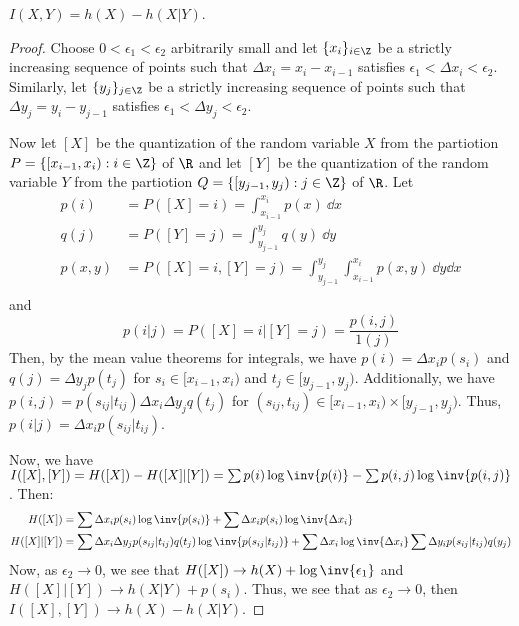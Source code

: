 \begin{theorem}\label{2.3.2}
    $I(X,Y)=h(X)-h(X|Y)$.
\end{theorem}
\begin{proof}
    Choose $0<\epsilon_1<\epsilon_2$ arbitrarily small and let $\{x_i\}_{i \in
    \Z}$ be a strictly increasing sequence of points such that
    $\Delta{x_i}=x_i-x_{i-1}$ satisfies $\epsilon_1<\Delta{x_i}<\epsilon_2$.
    Similarly, let $\{y_j\}_{j \in \Z}$ be a strictly increasing sequence of
    points such that $\Delta{y_j}=y_i-y_{j-1}$ satisfies
    $\epsilon_1<\Delta{y_j}<\epsilon_2$.

    Now let $[X]$ be the quantization of the random variable $X$ from the
    partiotion  $P=\{[x_{i-1},x_i) : i \in \Z\}$ of $\R$ and  let $[Y]$ be the
    quantization of the random variable $Y$ from the partiotion  $Q=\{[y_{j-1},y_j)
    : j \in \Z\}$ of $\R$. Let
    \begin{align*}
        p(i) &= P([X]=i)=\int_{x_{i-1}}^{x_i}{p(x)} \ \dd{x} \\
        q(j) &= P([Y]=j)=\int_{y_{j-1}}^{y_j}{q(y)} \ \dd{y} \\
        p(x,y) &=
        P([X]=i,[Y]=j)=\int_{y_{j-1}}^{y_j}{\int_{x_{i-1}}^{x_i}{p(x,y)}} \
        \dd{y}\dd{x} \\
    \end{align*}
    and
    \begin{equation*}
        p(i|j)=P([X]=i|[Y]=j)=\frac{p(i,j)}{1(j)}
    \end{equation*}
    Then, by the mean value theorems for integrals, we have
    $p(i)=\Delta{x_i}p(s_i)$ and  $q(j)=\Delta{y_j}p(t_j)$ for $s_i \in
    [x_{i-1}, x_i)$ and $t_j \in [y_{j-1},y_j)$. Additionally, we have
    $p(i,j)=p(s_{ij}|t_{ij})\Delta{x_i}\Delta{y_j}q(t_j)$ for $(s_{ij},t_{ij})
    \in [x_{i-1}, x_i) \times [y_{j-1},y_j)$. Thus,
    $p(i|j)=\Delta{x_i}p(s_{ij}|t_{ij})$.

    Now, we have $I([X],[Y])=H([X])-H([X]|[Y])=\sum{p(i)\log{\inv{p(i)}}}-
    \sum{p(i,j)\log{\inv{p(i,j)}}}$. Then:
    \begin{align*}
        H([X]) &= \sum{\Delta{x_i}p(s_i)\log{\inv{p(s_i)}}}+
                    \sum{\Delta{x_i}p(s_i)\log{\inv{\Delta{x_i}}}} \\
        H([X]|[Y]) &= \sum{\Delta{x_i}\Delta{y_j}p(s_{ij}|t_{ij})q(t_j)
        \log{\inv{p(s_{ij}|t_{ij})}}}+\sum{\Delta{x_i}\log{\inv{\Delta{x_i}}}
        \sum{\Delta{y_i}p(s_{ij}|t_{ij})q(y_j)}}
    \end{align*}
    Now, as $\epsilon_2 \rightarrow 0$, we see that $H([X]) \rightarrow
    h(X)+\log{\inv{\epsilon_1}}$ and $H([X]|[Y]) \rightarrow h(X|Y)+p(s_i)$.
    Thus, we see that as $\epsilon_2 \rightarrow 0$, then $I([X],[Y])
    \rightarrow h(X)-h(X|Y)$.
\end{proof}

